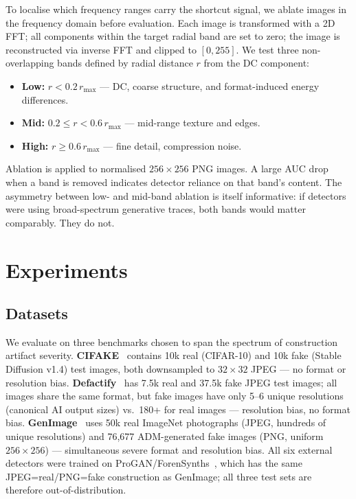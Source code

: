 \documentclass{bmvc2k}
\begin{document}
To localise which frequency ranges carry the shortcut signal, we ablate images in the frequency domain before evaluation. Each image is transformed with a 2D FFT; all components within the target radial band are set to zero; the image is reconstructed via inverse FFT and clipped to $[0, 255]$. We test three non-overlapping bands defined by radial distance $r$ from the DC component:
\begin{itemize}
  \item \textbf{Low:} $r < 0.2\,r_{\max}$ --- DC, coarse structure, and format-induced energy differences.
  \item \textbf{Mid:} $0.2 \leq r < 0.6\,r_{\max}$ --- mid-range texture and edges.
  \item \textbf{High:} $r \geq 0.6\,r_{\max}$ --- fine detail, compression noise.
\end{itemize}
Ablation is applied to normalised $256\times256$ PNG images. A large AUC drop when a band is removed indicates detector reliance on that band's content. The asymmetry between low- and mid-band ablation is itself informative: if detectors were using broad-spectrum generative traces, both bands would matter comparably. They do not.

\section{Experiments}
\label{sec:experiments}

\subsection{Datasets}
\label{sec:datasets}

We evaluate on three benchmarks chosen to span the spectrum of construction artifact severity.
\textbf{CIFAKE}~\cite{cifake} contains 10k real (CIFAR-10) and 10k fake (Stable Diffusion v1.4) test images, both downsampled to $32\times32$ JPEG --- no format or resolution bias.
\textbf{Defactify}~\cite{defactify} has 7.5k real and 37.5k fake JPEG test images; all images share the same format, but fake images have only 5--6 unique resolutions (canonical AI output sizes) vs.\ 180+ for real images --- resolution bias, no format bias.
\textbf{GenImage}~\cite{genimage} uses 50k real ImageNet photographs (JPEG, hundreds of unique resolutions) and 76{,}677 ADM-generated fake images (PNG, uniform $256\times256$) --- simultaneous severe format and resolution bias.
All six external detectors were trained on ProGAN/ForenSynths~\cite{wang2020cnn}, which has the same JPEG=real/PNG=fake construction as GenImage; all three test sets are therefore out-of-distribution.
\end{document}
